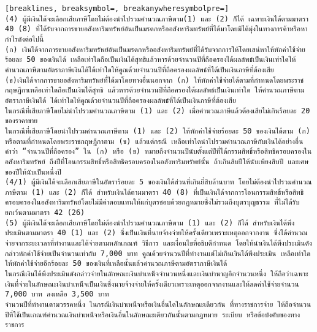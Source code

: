 \begin{Verbatim}[breaklines, breaksymbol=, breakanywheresymbolpre=]
(4) ผู้มีเงินได้จะเลือกเสียภาษีโดยไม่ต้องนำไปรวมคำนวณภาษีตาม(1) และ (2) ก็ได้ เฉพาะเงินได้ตามมาตรา 40 (8) ที่ได้รับจากการขายอสังหาริมทรัพย์อันเป็นมรดกหรืออสังหาริมทรัพย์ที่ได้มาโดยมิได้มุ่งในทางการค้าหรือหากำไรดังต่อไปนี้
(ก) เงินได้จากการขายอสังหาริมทรัพย์อันเป็นมรดกหรืออสังหาริมทรัพย์ที่ได้รับจากการให้โดยเสน่หาให้หักค่าใช้จ่ายร้อยละ 50 ของเงินได้ เหลือเท่าใดถือเป็นเงินได้สุทธิแล้วหารด้วยจำนวนปีที่ถือครองได้ผลลัพธ์เป็นเงินเท่าใดให้คำนวณภาษีตามอัตราภาษีเงินได้ได้เท่าใดให้คูณด้วยจำนวนปีที่ถือครองผลลัพธ์ที่ได้เป็นเงินภาษีที่ต้องเสีย
(ข)เงินได้จากการขายอสังหาริมทรัพย์ที่ได้มาโดยทางอื่นนอกจาก (ก) ให้หักค่าใช้จ่ายได้ตามที่กำหนดโดยพระราชกฤษฎีกาเหลือเท่าใดถือเป็นเงินได้สุทธิ แล้วหารด้วยจำนวนปีที่ถือครองได้ผลลัพธ์เป็นเงินเท่าใด ให้คำนวณภาษีตามอัตราภาษีเงินได้ ได้เท่าใดให้คูณด้วยจำนวนปีที่ถือครองผลลัพธ์ที่ได้เป็นเงินภาษีที่ต้องเสีย
ในกรณีที่เสียภาษีโดยไม่นำไปรวมคำนวณภาษีตาม (1) และ (2) เมื่อคำนวณภาษีแล้วต้องเสียไม่เกินร้อยละ 20 ของราคาขาย
ในกรณีที่เสียภาษีโดยนำไปรวมคำนวณภาษีตาม (1) และ (2) ให้หักค่าใช้จ่ายร้อยละ 50 ของเงินได้ตาม (ก) หรือตามที่กำหนดโดยพระราชกฤษฎีกาตาม (ข) แล้วแต่กรณี เหลือเท่าใดนำไปรวมคำนวณภาษีกับเงินได้อย่างอื่น
คำว่า “จำนวนปีที่ถือครอง” ใน (ก) หรือ (ข) หมายถึงจำนวนปีนับตั้งแต่ปีที่ได้กรรมสิทธิ์หรือสิทธิครอบครองในอสังหาริมทรัพย์ ถึงปีที่โอนกรรมสิทธิ์หรือสิทธิครอบครองในอสังหาริมทรัพย์นั้น ถ้าเกินสิบปีให้นับเพียงสิบปี และเศษของปีให้นับเป็นหนึ่งปี
(4/1) ผู้มีเงินได้จะเลือกเสียภาษีในอัตราร้อยละ 5 ของเงินได้ส่วนที่เกินยี่สิบล้านบาท โดยไม่ต้องนำไปรวมคำนวณภาษีตาม (1) และ (2) ก็ได้ สำหรับเงินได้ตามมาตรา 40 (8) ที่เป็นเงินได้จากการโอนกรรมสิทธิ์หรือสิทธิครอบครองในอสังหาริมทรัพย์โดยไม่มีค่าตอบแทนให้แก่บุตรชอบด้วยกฎหมายซึ่งไม่รวมถึงบุตรบุญธรรม ที่ไม่ได้รับยกเว้นตามมาตรา 42 (26)
(5) ผู้มีเงินได้จะเลือกเสียภาษีโดยไม่ต้องนำไปรวมคำนวณภาษีตาม (1) และ (2) ก็ได้ สำหรับเงินได้พึงประเมินตามมาตรา 40 (1) และ (2) ซึ่งเป็นเงินที่นายจ้างจ่ายให้ครั้งเดียวเพราะเหตุออกจากงาน ซึ่งได้คำนวณจ่ายจากระยะเวลาที่ทำงานและได้จ่ายตามหลักเกณฑ์ วิธีการ และเงื่อนไขที่อธิบดีกำหนด โดยให้นำเงินได้พึงประเมินดังกล่าวหักค่าใช้จ่ายเป็นจำนวนเท่ากับ 7,000 บาท คูณด้วยจำนวนปีที่ทำงานแต่ไม่เกินเงินได้พึงประเมิน เหลือเท่าใดให้หักค่าใช้จ่ายอีกร้อยละ 50 ของเงินที่เหลือนั้นแล้วคำนวณภาษีตามอัตราภาษีเงินได้
ในกรณีเงินได้พึงประเมินดังกล่าวจ่ายในลักษณะเงินบำเหน็จจำนวนหนึ่งและเงินบำนาญอีกจำนวนหนึ่ง ให้ถือว่าเฉพาะเงินที่จ่ายในลักษณะเงินบำเหน็จเป็นเงินซึ่งนายจ้างจ่ายให้ครั้งเดียวเพราะเหตุออกจากงานและให้ลดค่าใช้จ่ายจำนวน 7,000 บาท ลงเหลือ 3,500 บาท
จำนวนปีที่ทำงานตามวรรคหนึ่ง ในกรณีเงินบำเหน็จหรือเงินอื่นใดในลักษณะเดียวกัน ที่ทางราชการจ่าย ให้ถือจำนวนปีที่ใช้เป็นเกณฑ์คำนวณเงินบำเหน็จหรือเงินอื่นในลักษณะเดียวกันนั้นตามกฎหมาย ระเบียบ หรือข้อบังคับของทางราชการ

\end{Verbatim}
